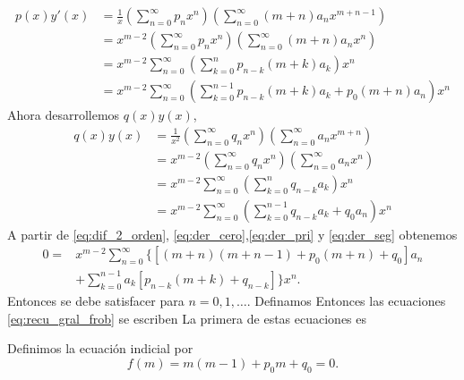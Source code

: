 \documentclass{article}
\begin{document}
\begin{equation}\label{eq:der_pri}
  \begin{split}
    p(x)y'(x)&=\frac{1}{x}\left(\sum_{n=0}^{\infty}p_nx^n\right)\left(\sum_{n=0}^{\infty}(m+n)a_{n}x^{m+n-1}\right)\\
&=x^{m-2}\left(\sum_{n=0}^{\infty}p_nx^n\right)\left(\sum_{n=0}^{\infty}(m+n)a_{n}x^{n}\right)\\
&= x^{m-2}\sum_{n=0}^{\infty}\left(\sum_{k=0}^np_{n-k}(m+k)a_k\right)x^n\\
&= x^{m-2}\sum_{n=0}^{\infty}\left(\sum_{k=0}^{n-1}p_{n-k}(m+k)a_k+p_0(m+n)a_n\right)x^n
  \end{split}
\end{equation}
Ahora desarrollemos $q(x)y(x)$,
\begin{equation}\label{eq:der_cero}
  \begin{split}
    q(x)y(x)&=\frac{1}{x^2}\left(\sum_{n=0}^{\infty}q_nx^n\right)\left(\sum_{n=0}^{\infty}a_{n}x^{m+n}\right)\\
&=x^{m-2}\left(\sum_{n=0}^{\infty}q_nx^n\right)\left(\sum_{n=0}^{\infty}a_{n}x^{n}\right)\\
&= x^{m-2}\sum_{n=0}^{\infty}\left(\sum_{k=0}^nq_{n-k}a_k\right)x^n\\
&= x^{m-2}\sum_{n=0}^{\infty}\left(\sum_{k=0}^{n-1}q_{n-k}a_k+q_0a_n\right)x^n
  \end{split}
\end{equation}
A partir de \eqref{eq:dif_2_orden}, \eqref{eq:der_cero},\eqref{eq:der_pri} y \eqref{eq:der_seg} obtenemos
\begin{equation}
\begin{split}
  0=&x^{m-2}\sum_{n=0}^{\infty}\bigg\{\left[(m+n)(m+n-1)+p_0(m+n)  +q_0  \right] a_{n}\\&+\sum_{k=0}^{n-1}a_k\left[p_{n-k}(m+k) +
q_{n-k}\right]\bigg\}x^n.
\end{split}
\end{equation}
Entonces se debe satisfacer
para $n=0,1,\ldots$. Definamos
Entonces las ecuaciones \eqref{eq:recu_gral_frob} se escriben
La primera de estas ecuaciones es 
\begin{definicion} Definimos la  ecuación indicial por
\begin{equation}\label{eq:eq_indicial} 
  f(m)=m(m-1)+p_0m+q_0=0.
\end{equation}

\end{definicion}
\end{document}
